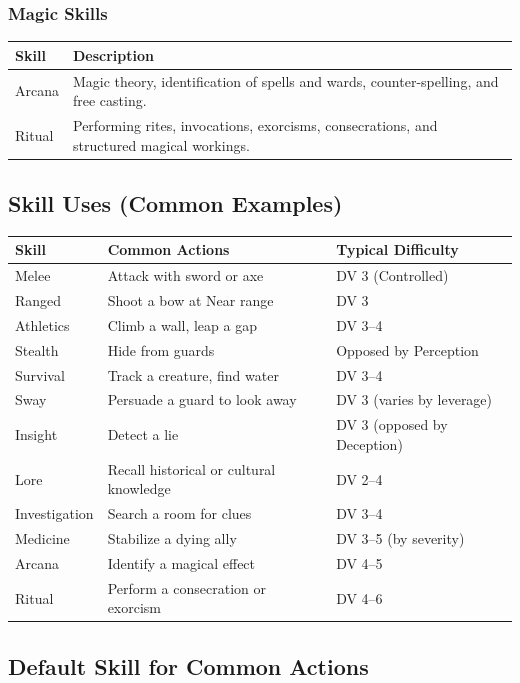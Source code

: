 \subsubsection{Magic Skills}

\begin{tabular}{@{}lp{10cm}@{}}
\toprule
\textbf{Skill} & \textbf{Description} \\
\midrule
Arcana & Magic theory, identification of spells and wards, counter-spelling, and free casting. \\
Ritual & Performing rites, invocations, exorcisms, consecrations, and structured magical workings. \\
\bottomrule
\end{tabular}

\subsection{Skill Uses (Common Examples)}

\begin{tabular}{@{}lll@{}}
\toprule
\textbf{Skill} & \textbf{Common Actions} & \textbf{Typical Difficulty} \\
\midrule
Melee & Attack with sword or axe & DV 3 (Controlled) \\
Ranged & Shoot a bow at Near range & DV 3 \\
Athletics & Climb a wall, leap a gap & DV 3–4 \\
Stealth & Hide from guards & Opposed by Perception \\
Survival & Track a creature, find water & DV 3–4 \\
Sway & Persuade a guard to look away & DV 3 (varies by leverage) \\
Insight & Detect a lie & DV 3 (opposed by Deception) \\
Lore & Recall historical or cultural knowledge & DV 2–4 \\
Investigation & Search a room for clues & DV 3–4 \\
Medicine & Stabilize a dying ally & DV 3–5 (by severity) \\
Arcana & Identify a magical effect & DV 4–5 \\
Ritual & Perform a consecration or exorcism & DV 4–6 \\
\bottomrule
\end{tabular}

\subsection{Default Skill for Common Actions}

